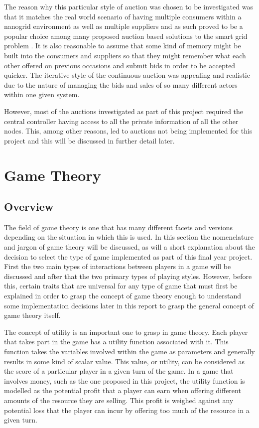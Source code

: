 \documentclass[a4paper, notitlepage]{report}
\begin{document}
The reason why this particular style of auction was chosen to be investigated
was that it matches the real world scenario of having multiple consumers within
a nanogrid environment as well as multiple suppliers and as such proved to be a
popular choice among many proposed auction based solutions to the smart grid
problem \cite{ramachandran2011intelligent}. It is also reasonable to
assume that some kind of memory might be built into the consumers and suppliers
so that they might remember what each other offered on previous occasions and
submit bids in order to be accepted quicker. The iterative style of the
continuous auction was appealing and realistic due to the nature of managing the
bids and sales of so many different actors within one given system.

However, most of the auctions investigated as part of this project required the central
controller having access to all the private information of all the other nodes.
This, among other reasons, led to auctions not being implemented for this
project and this will be discussed in further detail later.
\chapter{Game Theory}
\label{sec:orgc8b567b}
\section{Overview}
\label{sec:org9616bbf}
The field of game theory is one that has many different facets and versions
depending on the situation in which this is used. In this section the
nomenclature and jargon of game theory will be discussed, as will a short
explanation about the decision to select the type of game implemented as part of
this final year project. First the two main types of interactions between
players in a game will be discussed and after that the two primary types of
playing styles. However, before this, certain traits that are universal for any
type of game that must first be explained in order to grasp the concept of game
theory enough to understand some implementation decisions later in this report
to grasp the general concept of game theory itself.

The concept of utility is an important one to grasp in game theory. Each player
that takes part in the game has a utility function associated with it. This
function takes the variables involved within the game as parameters and
generally results in some kind of scalar value. This value, or utility, can be
considered as the score of a particular player in a given turn of the game. In a
game that involves money, such as the one proposed in this project, the utility
function is modelled as the potential profit that a player can earn when offering
different amounts of the resource they are selling. This profit is weighed
against any potential loss that the player can incur by offering too much of the
resource in a given turn.
\end{document}
